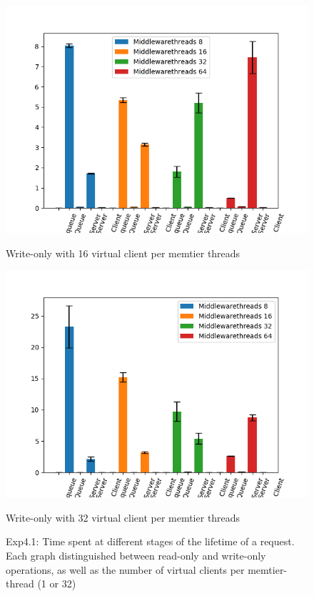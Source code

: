 \documentclass[11pt,a4paper]{article}
\begin{document}
\begin{figure}[H]
\begin{minipage}[b]{0.5\linewidth}
    \includegraphics[width=0.9\linewidth]{img/exp4_1/exp4_1_mw_percentile_plots_writes_1__vc_16.png} 
    \caption{Write-only with 16 virtual client per memtier threads} 
    \vspace{4ex}
  \end{minipage}%
  \begin{minipage}[b]{0.5\linewidth}
    \centering
    \includegraphics[width=0.9\linewidth]{img/exp4_1/exp4_1_mw_percentile_plots_writes_1__vc_32.png} 
    \caption{Write-only with 32 virtual client per memtier threads} 
    \vspace{4ex}
  \end{minipage}
  \caption{Exp4.1: Time spent at different stages of the lifetime of a request. Each graph distinguished between read-only and write-only operations, as well as the number of virtual clients per memtier-thread (1 or 32)}
\end{figure}
\end{document}
